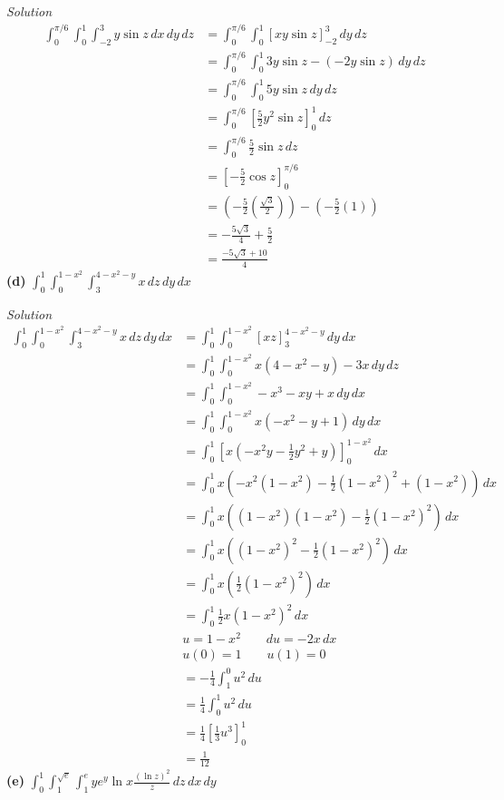 \documentclass{article}
\newcommand{\lrp}[1]{\left( #1 \right)}
\newcommand{\lrb}[1]{\left[ #1 \right]}
\newcommand{\Solution}{\textit{Solution}}
\begin{document}
\Solution\begin{align*}
    \int_0^{\pi/6}\int_0^1\int_{-2}^3 y\sin z \,dx\,dy\,dz &= \int_0^{\pi/6}\int_0^1 \lrb{xy\sin z}_{-2}^3\,dy\,dz\\
    &= \int_0^{\pi/6}\int_0^1 3y\sin z - (-2y\sin z)\,dy\,dz\\
    &=  \int_0^{\pi/6}\int_0^1 5y \sin z \,dy\,dz\\
    &=\int_0^{\pi/6}\lrb{\frac{5}{2}y^2\sin z}_0^1\,dz\\
    &=\int_0^{\pi/6}\frac{5}{2}\sin z\,dz\\
    &=\lrb{-\frac{5}{2}\cos z}_0^{\pi / 6}\\
    &=\lrp{-\frac{5}{2}\lrp{\frac{\sqrt{3}}{2}}}-\lrp{-\frac{5}{2}(1)}\\
    &=-\frac{5\sqrt{3}}{4}+\frac{5}{2}\\
    &=\boxed{\frac{-5\sqrt{3}+10}{4}}
\end{align*}
\newpage
\textbf{(d)} $\displaystyle \int_0^1\int_0^{1-x^2}\int_3^{4-x^2-y}x\,dz\,dy\,dx$

\Solution
\begin{align*}
    \int_0^1\int_0^{1-x^2}\int_3^{4-x^2-y}x\,dz\,dy\,dx&=\int_0^1\int_0^{1-x^2}\lrb{xz}_3^{4-x^2-y}\,dy\,dx\\
    &=\int_0^1\int_0^{1-x^2} x(4-x^2-y) - 3x\,dy\,dz\\
    &=\int_0^1\int_0^{1-x^2} -x^3 -xy +x\,dy\,dx\\
    &=\int_0^1\int_0^{1-x^2} x(-x^2-y+1)\,dy\,dx\\
    &=\int_0^1\lrb{x(-x^2y-\frac{1}{2}y^2+y)}_0^{1-x^2}\,dx\\
    &=\int_0^1 x\lrp{-x^2(1-x^2)-\frac{1}{2}(1-x^2)^2+(1-x^2)}\,dx\\
    &=\int_0^1 x\lrp{(1-x^2)(1-x^2)-\frac{1}{2}(1-x^2)^2}\,dx\\
    &=\int_0^1 x\lrp{(1-x^2)^2-\frac{1}{2}(1-x^2)^2}\,dx\\
    &=\int_0^1 x\lrp{\frac{1}{2}(1-x^2)^2}\,dx\\
    &=\int_0^1\frac{1}{2}x(1-x^2)^2\,dx\\
    &u= 1-x^2\hspace{2em} du=-2x\,dx\\
    &u(0)=1\hspace{2em} u(1)=0\\
    &=-\frac{1}{4}\int_1^0 u^2\,du\\
    &=\frac{1}{4}\int_0^1 u^2\,du\\
    &=\frac{1}{4}\lrb{\frac{1}{3}u^3}_0^1\\
    &=\boxed{\frac{1}{12}}
\end{align*}
\newpage
\textbf{(e)} $\displaystyle \int_0^1\int_1^{\sqrt{e}}\int_1^e ye^y\ln x\frac{(\ln z)^2}{z}\,dz\,dx\,dy$
\end{document}
